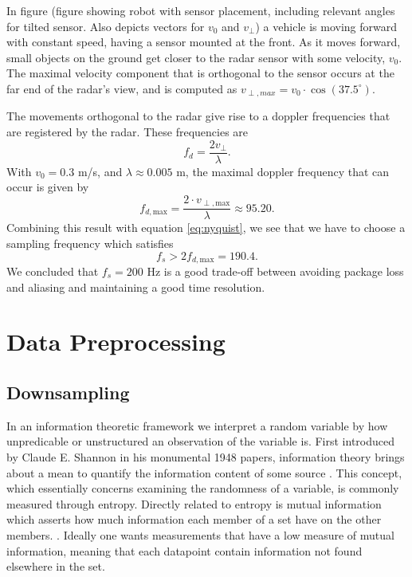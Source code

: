 In figure (figure showing robot with sensor placement, including relevant angles for tilted sensor. Also depicts vectors for $v_0$ and $v_\perp$) a vehicle is moving forward with constant speed, having a sensor mounted at the front. As it moves forward, small objects on the ground get closer to the radar sensor with some velocity, $v_0$. The maximal velocity component that is orthogonal to the sensor occurs at the far end of the radar's view, and is computed as $v_{\perp, max} = v_0\cdot \cos(37.5^\circ)$.

The movements orthogonal to the radar give rise to a doppler frequencies that are registered by the radar. These frequencies are \citep{lien_gillian_karagozler_amihood_schwesig_olson_raja_poupyrev_2016}
\begin{equation}
	f_{d} = \frac{2v_\perp}{\lambda}.
\end{equation}
With $v_0=0.3$ m/s, and $\lambda \approx 0.005$ m, the maximal doppler frequency that can occur is given by 
\begin{equation}
	f_{d,\textrm{max}} = \frac{2\cdot v_{\perp, \textrm{max}}}{\lambda} \approx 95.20.
\end{equation}
Combining this result with equation \eqref{eq:nyquist}, we see that we have to choose a sampling frequency which satisfies
\begin{equation}
	f_s > 2f_{d,\textrm{max}} = 190.4.
\end{equation}
We concluded that $f_s=200$ Hz is a good trade-off between avoiding package loss and aliasing and maintaining a good time resolution.

\section{Data Preprocessing}
\subsection{Downsampling}

In an information theoretic framework we interpret a random variable by how unpredicable or unstructured an observation of the variable is\citep{anderson_johnnesson_2006}. First introduced by Claude E. Shannon in his monumental 1948 papers, information theory brings about a mean to quantify the information content of some source \citep{shannon_1948}. This concept, which essentially concerns examining the randomness of a variable, is commonly measured through entropy. Directly related to entropy is mutual information which asserts how much information each member of a set have on the other members. \citep{hyvasrinen_karhunen_oja_2004}. Ideally one wants measurements that have a low measure of mutual information, meaning that each datapoint contain information not found elsewhere in the set. 

